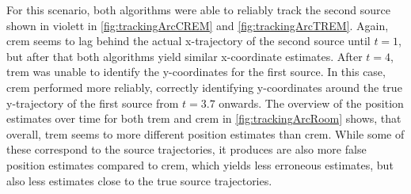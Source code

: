 


For this scenario, both algorithms were able to reliably track the second source shown in violett in \autoref{fig:trackingArcCREM} and \autoref{fig:trackingArcTREM}. Again, \gls{crem} seems to lag behind the actual x-trajectory of the second source until $t=1$, but after that both algorithms yield similar x-coordinate estimates. After $t=4$, \gls{trem} was unable to identify the y-coordinates for the first source. In this case, \gls{crem} performed more reliably, correctly identifying y-coordinates around the true y-trajectory of the first source from $t=3.7$ onwards. The overview of the position estimates over time for both \gls{trem} and \gls{crem} in \autoref{fig:trackingArcRoom} shows, that overall, \gls{trem} seems to more different position estimates than \gls{crem}. While some of these correspond to the source trajectories, it produces are also more false position estimates compared to \gls{crem}, which yields less erroneous estimates, but also less estimates close to the true source trajectories.


\FloatBarrier
\toggletrue{quick}

